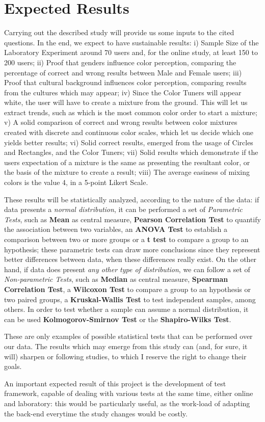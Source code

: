 \documentclass{report}
\begin{document}
\section{Expected Results}
Carrying out the described study will provide us some inputs to the cited questions. In the end, we expect to have sustainable results:
i) Sample Size of the Laboratory Experiment around 70 users and, for the online study, at least 150 to 200 users;  
ii) Proof that genders influence color perception, comparing the percentage of correct and wrong results between Male and Female users;
iii) Proof that cultural background influences color perception, comparing results from the cultures which may appear;
iv) Since the Color Tuners will appear white, the user will have to create a mixture from the ground. This will let us extract trends, such as which
is the most common color order to start a mixture;
v) A solid comparison of correct and wrong results between color mixtures created with discrete and continuous color scales, which let us decide
which one yields better results;
vi) Solid correct results, emerged from the usage of Circles and Rectangles, and the Color Tuners;
vii) Solid results which demonstrate if the users expectation of a mixture is the same as presenting the resultant color, or the basis of the mixture
to create a result; viii) The average easiness of mixing colors is the value 4, in a 5-point Likert Scale. \par
These results will be statistically analyzed, according to the nature of the data: if data presents a \emph{normal distribution}, it can be
performed a set of \emph{Parametric Tests}, such as \textbf{Mean} as central measure, \textbf{Pearson Correlation Test} to quantify the
association between two variables, an \textbf{ANOVA Test} to establish a comparison between two or more groups or a \textbf{t test} to compare
a group to an hypothesis; these parametric tests can draw more conclusions since they represent better differences between data, when these
differences really exist. On the other hand, if data does present \emph{any other type of distribution}, we can follow a set of
\emph{Non-parametric Tests}, such as \textbf{Median} as central measure, \textbf{Spearman Correlation Test}, a \textbf{Wilcoxon Test} to compare
a group to an hypothesis or two paired groups, a \textbf{Kruskal-Wallis Test} to test independent samples, among others. In order to test whether
a sample can assume a normal distribution, it can be used \textbf{Kolmogorov-Smirnov Test} or the \textbf{Shapiro-Wilks Test}. \par
These are only examples of possible statistical tests that can be performed over our data. The results which may emerge from this study can 
(and, for sure, it will) sharpen or following studies, to which I reserve the right to change their goals. \par
An important expected result of this project is the development of test framework, capable of dealing with various tests at the same time, either online
and laboratory: this would be particularly useful, as the work-load of adapting the back-end everytime the study changes would be costly.
%
\end{document}
